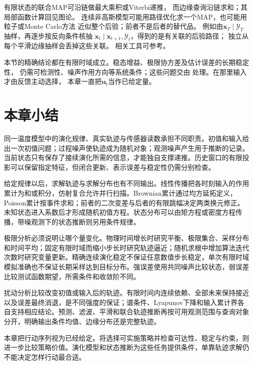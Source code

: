 有限状态的联合MAP可沿链做最大乘积或Viterbi递推，
而边缘查询沿链求和；其局部函数计算回见图论。
连续非高斯模型可能用路径优化求一个MAP，也可能用粒子或Monte Carlo方法
近似整个后验；前者不是后者的替代品。
例如由$\bm x_T\mid\mathcal Y_T$抽样，再逐步按反向条件核抽
$\bm x_t\mid\bm x_{t+1},\mathcal Y_t$，得到的是有关联的后验路径；
独立从每个平滑边缘抽样会丢掉这些关联。
相关工具可参考。

本节的精确结论都在有限时域成立。稳态增益、极限协方差及估计误差的长期稳定性，
仍需可检测性、噪声作用方向等系统条件；这些问题交由
处理。在那里输入才由反馈主动选择，
本章一直把$\bm u_t$当作已给定量。

\section{本章小结}
\label{sec:dynamical-systems-state-estimation-summary}

同一温度模型中的演化规律、真实轨迹与传感器读数承担不同职责。初值和输入给出一次初值问题；过程噪声使轨迹成为随机对象；观测噪声产生用于推断的记录。当前状态只有保存了接续演化所需的信息，才能独自支撑递推。历史窗口的有限投影可以保留指定特征，但闭合更新、表示误差与稳定性仍需分别检查。

给定规律以后，求解轨迹与求解分布也有不同输出。线性传播把各时刻输入的作用累计为和或积分，仿射复合允许并行扫描。Brownian累计通过均方延拓定义，Poisson累计按事件求和；前者的二次变差与后者的有限跳幅决定两类换元修正。未知状态进入系数后才形成随机初值方程。状态分布可以由矩方程或密度方程传播，带噪观测下的状态推断则另用条件规律。

极限分析必须说明让哪个量变化。物理时间增长时研究平衡、极限集合、采样分布和时间平均；固定有限时域而缩小步长时研究轨迹逼近；随机求根中增加算法迭代次数时研究变量更新。精确连续演化稳定不保证任意数值步长稳定，单次有限时域模拟准确也不保证长期采样达到目标分布。强误差使用共同噪声比较状态，弱误差比较测试函数期望，所需条件和收敛阶不同。

扰动分析比较改变初值或输入后的轨迹。有限时间内连续依赖、全部未来保持接近以及误差最终消退，是不同强度的保证；谱条件、Lyapunov下降和输入累计界各自支持相应结论。预测、滤波、平滑和联合轨迹推断再按可用观测范围与查询对象分开，明确输出条件均值、边缘分布还是完整轨迹。

本章把行动序列视为已经给定。将选择可实施策略并检查可达性、稳定与约束，则进一步比较策略价值。演化模型和状态推断为这些任务提供条件，单靠轨迹求解仍不能决定怎样行动最合适。
